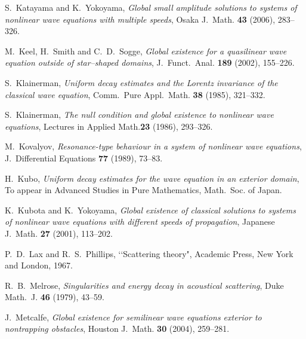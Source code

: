 \documentclass[12pt]{amsart}
\numberwithin{equation}{section}
\begin{document}
\begin{thebibliography}{99}
S.~Katayama and K.~Yokoyama,
{\it Global small amplitude solutions to systems of nonlinear wave
equations with multiple speeds}, 
Osaka J.~Math.
{\bf 43} (2006), 283--326.

M.~Keel, H.~Smith and C.~D.~Sogge,
{\it Global existence for a quasilinear wave equation outside of
star--shaped domains}, J.~Funct.~Anal. {\bf 189} (2002), 155--226.



S.~Klainerman,
{\it Uniform decay estimates and the Lorentz invariance
of the classical wave equation},
 Comm.~Pure Appl.~Math.
{\bf 38} (1985), 321--332.

S.~Klainerman, 
{\it The null condition and global existence to nonlinear wave equations},
Lectures in Applied Math.{\bf 23} (1986), {293--326}.

M.~Kovalyov, 
{\it Resonance-type behaviour in a system of nonlinear
                   wave equations},
  J.~Differential Equations {\bf 77} (1989), 73--83.

H.~Kubo,
{\it
Uniform decay estimates for the wave equation in an exterior domain},
To appear in Advanced Studies in Pure Mathematics,
Math.~Soc. of Japan.

 K.~Kubota and K.~Yokoyama, 
     {\it Global existence of classical solutions to
                       systems of nonlinear wave equations with different
                       speeds of propagation},
  Japanese J.~Math. {\bf 27} (2001), 113--202.
  

P.~D.~Lax and R.~S.~Phillips,
\lq\lq  Scattering theory", 
Academic Press, New York and London, 1967.

R.~B.~Melrose, 
{\it 
Singularities and energy decay in acoustical scattering},
 Duke Math.~J. 
{\bf 46} (1979), 43--59.

J.~Metcalfe,
{\it
Global existence for semilinear wave equations exterior to
nontrapping obstacles},
 Houston J.~Math.
{\bf 30} (2004), 259--281.


\end{thebibliography}
\end{document}
